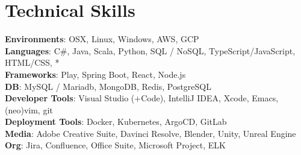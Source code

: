 \documentclass[letterpaper,11pt]{article}
\begin{document}
%
\section{Technical Skills}
\begin{itemize}[leftmargin=0.15in, label={}]
  \small{\item{
                \textbf{Environments}{: OSX, Linux, Windows, AWS, GCP } \\
                \textbf{Languages}{: C\#, Java, Scala, Python, SQL / NoSQL, TypeScript/JavaScript, HTML/CSS, * } \\
                \textbf{Frameworks}{: Play, Spring Boot, React, Node.js } \\
                \textbf{DB}{: MySQL / Mariadb, MongoDB, Redis, PostgreSQL } \\
                \textbf{Developer Tools}{: Visual Studio (+Code), IntelliJ IDEA, Xcode, Emacs, (neo)vim, git } \\
                \textbf{Deployment Tools}{: Docker, Kubernetes, ArgoCD, GitLab } \\
                \textbf{Media}{: Adobe Creative Suite, Davinci Resolve, Blender, Unity, Unreal Engine} \\
                \textbf{Org}{: Jira, Confluence, Office Suite, Microsoft Project, ELK }
          }}
\end{itemize}


\end{document}
